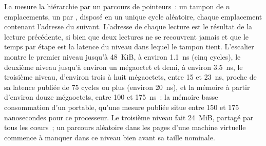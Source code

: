 La  mesure la hiérarchie par un parcours de pointeurs~: un tampon de $n$ emplacements, un par
, disposé en un unique cycle aléatoire, chaque emplacement contenant l'adresse du suivant. L'adresse de chaque lecture est
le résultat de la lecture précédente, si bien que deux lectures ne se recouvrent jamais et que le temps par étape est la latence du niveau dans lequel le
tampon tient. L'escalier montre le premier niveau jusqu'à 48~KiB, à environ \qty{1.1}{\nano\second} (cinq cycles), le deuxième
niveau jusqu'à environ un mégaoctet et demi, à environ \qty{3.5}{\nano\second}, le troisième niveau, d'environ trois à huit
mégaoctets, entre 15 et \qty{23}{\nano\second}, proche de sa latence publiée de 75 cycles ou plus (environ
\qty{20}{\nano\second}), et la mémoire à partir d'environ douze mégaoctets, entre 100 et \qty{175}{\nano\second}~: la
mémoire basse consommation d'un portable, qu'une mesure publiée situe entre 150 et 175 nanosecondes pour ce processeur. Le
troisième niveau fait 24~MiB, partagé par tous les cœurs~; un parcours aléatoire dans les pages d'une machine virtuelle commence à manquer dans ce
niveau bien avant sa taille nominale.

